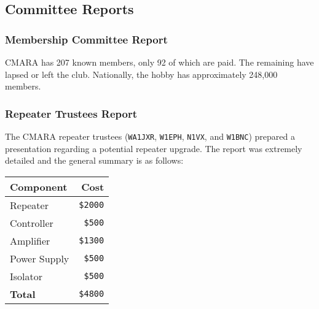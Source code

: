 \documentclass[10pt,letterpaper]{article}
\begin{document}

\subsection{Committee Reports}

\subsubsection{Membership Committee Report}
CMARA has 207 known members, only 92 of which are paid. The remaining have lapsed or left the club. Nationally, the hobby has approximately 248,000 members.

\subsubsection{Repeater Trustees Report}
The CMARA repeater trustees (\texttt{WA1JXR}, \texttt{W1EPH}, \texttt{N1VX}, and \texttt{W1BNC}) prepared a presentation regarding a potential repeater upgrade. The report was extremely detailed and the general summary is as follows: \\

\noindent
\begin{tabular}{|l|r|}
\hline
\textbf{Component} & \textbf{Cost} \\ \hline
Repeater & \texttt{\$2000} \\
Controller & \texttt{\$500} \\
Amplifier & \texttt{\$1300} \\
Power Supply & \texttt{\$500} \\
Isolator & \texttt{\$500} \\ \hline
\textbf{Total} & \texttt{\$4800} \\ \hline
\end{tabular}
\end{document}
